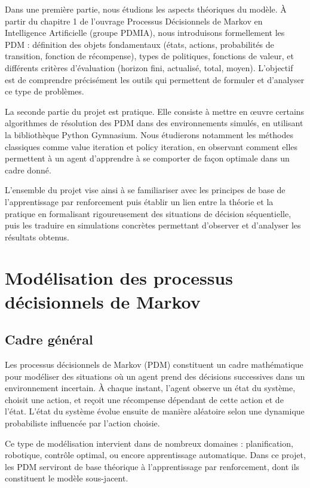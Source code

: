 \documentclass[12pt]{article}
\begin{document}
Dans une première partie, nous étudions les aspects théoriques du modèle. À partir du chapitre 1 de l’ouvrage Processus Décisionnels de Markov en Intelligence Artificielle (groupe PDMIA), nous introduisons formellement les PDM : définition des objets fondamentaux (états, actions, probabilités de transition, fonction de récompense), types de politiques, fonctions de valeur, et différents critères d’évaluation (horizon fini, actualisé, total, moyen). L’objectif est de comprendre précisément les outils qui permettent de formuler et d’analyser ce type de problèmes.

La seconde partie du projet est pratique. Elle consiste à mettre en œuvre certains algorithmes de résolution des PDM dans des environnements simulés, en utilisant la bibliothèque Python Gymnasium. Nous étudierons notamment les méthodes classiques comme value iteration et policy iteration, en observant comment elles permettent à un agent d'apprendre à se comporter de façon optimale dans un cadre donné.

L’ensemble du projet vise ainsi à se familiariser avec les principes de base de l'apprentissage par renforcement puis établir un lien entre la théorie et la pratique en formalisant rigoureusement des situations de décision séquentielle, puis les traduire en simulations concrètes permettant d’observer et d’analyser les résultats obtenus.

 \newpage

\section{Modélisation des processus décisionnels de Markov}

\subsection{Cadre général}

Les processus décisionnels de Markov (PDM) constituent un cadre mathématique pour modéliser des situations où un agent prend des décisions successives dans un environnement incertain. À chaque instant, l’agent observe un état du système, choisit une action, et reçoit une récompense dépendant de cette action et de l’état. L’état du système évolue ensuite de manière aléatoire selon une dynamique probabiliste influencée par l’action choisie.

Ce type de modélisation intervient dans de nombreux domaines : planification, robotique, contrôle optimal, ou encore apprentissage automatique. Dans ce projet, les PDM serviront de base théorique à l’apprentissage par renforcement, dont ils constituent le modèle sous-jacent.
\end{document}

